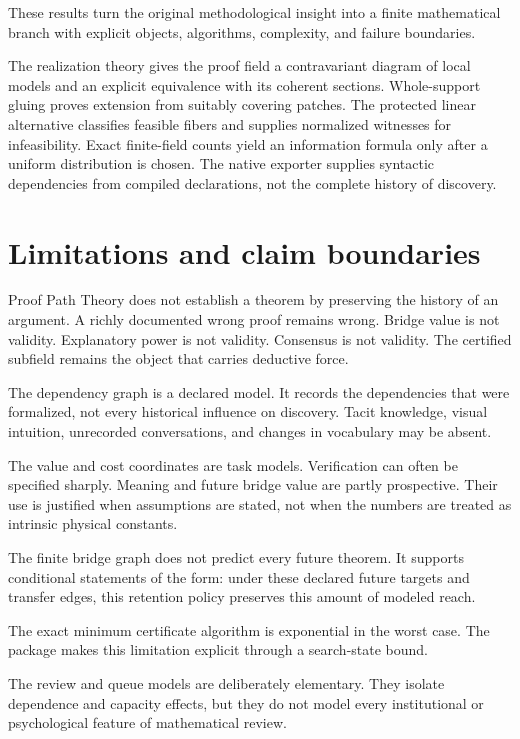 \documentclass[11pt,oneside]{article}
\theoremstyle{komorebiplain}
\theoremstyle{komorebidefinition}
\theoremstyle{komorebiremark}
\begin{document}
These results turn the original methodological insight into a finite mathematical branch with explicit objects, algorithms, complexity, and failure boundaries.

\noindent The realization theory gives the proof field a contravariant diagram of local models and an explicit equivalence with its coherent sections. Whole-support gluing proves extension from suitably covering patches. The protected linear alternative classifies feasible fibers and supplies normalized witnesses for infeasibility. Exact finite-field counts yield an information formula only after a uniform distribution is chosen. The native exporter supplies syntactic dependencies from compiled declarations, not the complete history of discovery.


\section{Limitations and claim boundaries}
\label{sec:old27}

Proof Path Theory does not establish a theorem by preserving the history of an argument. A richly documented wrong proof remains wrong. Bridge value is not validity. Explanatory power is not validity. Consensus is not validity. The certified subfield remains the object that carries deductive force.

The dependency graph is a declared model. It records the dependencies that were formalized, not every historical influence on discovery. Tacit knowledge, visual intuition, unrecorded conversations, and changes in vocabulary may be absent.

The value and cost coordinates are task models. Verification can often be specified sharply. Meaning and future bridge value are partly prospective. Their use is justified when assumptions are stated, not when the numbers are treated as intrinsic physical constants.

The finite bridge graph does not predict every future theorem. It supports conditional statements of the form: under these declared future targets and transfer edges, this retention policy preserves this amount of modeled reach.

The exact minimum certificate algorithm is exponential in the worst case. The package makes this limitation explicit through a search-state bound.

The review and queue models are deliberately elementary. They isolate dependence and capacity effects, but they do not model every institutional or psychological feature of mathematical review.
\end{document}
